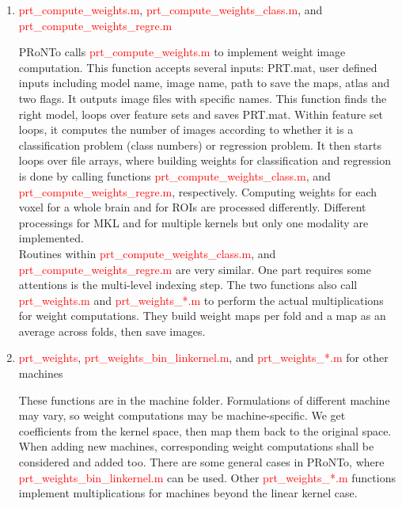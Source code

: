 
\begin{enumerate}

\item \textcolor{red}{prt\_compute\_weights.m}, \textcolor{red}{prt\_compute\_weights\_class.m}, and \textcolor{red}{prt\_compute\_weights\_regre.m}
 
PRoNTo calls \textcolor{red}{prt\_compute\_weights.m} to implement weight image computation. This function accepts several inputs: PRT.mat, user defined inputs including model name, image name, path to save the maps, atlas and two flags. It outputs image files with specific names. This function finds the right model, loops over feature sets and saves PRT.mat. Within feature set loops, it computes the number of images according to whether it is a classification problem (class numbers) or regression problem. It then starts loops over file arrays, where building weights for classification and regression is done by calling functions \textcolor{red}{prt\_compute\_weights\_class.m}, and \textcolor{red}{prt\_compute\_weights\_regre.m}, respectively. Computing weights for each voxel for a whole brain and for ROIs are processed differently. Different processings for MKL and for multiple kernels but only one modality are implemented.
\\
 
Routines within  \textcolor{red}{prt\_compute\_weights\_class.m}, and \textcolor{red}{prt\_compute\_weights\_regre.m} are very similar. One part requires some attentions is the multi-level indexing step. The two functions also call \textcolor{red}{prt\_weights.m} and \textcolor{red}{prt\_weights\_*.m} to perform the actual multiplications for weight computations. They build weight maps per fold and a map as an average across folds, then save images.    
 
\item \textcolor{red}{prt\_weights}, \textcolor{red}{prt\_weights\_bin\_linkernel.m}, and \textcolor{red}{prt\_weights\_*.m} for other machines

These functions are in the machine folder. Formulations of different machine may vary, so weight computations may be machine-specific. We get coefficients from the kernel space, then map them back to the original space. When adding new machines, corresponding weight computations shall be considered and added too. There are some general cases in PRoNTo, where \textcolor{red}{prt\_weights\_bin\_linkernel.m} can be used. Other \textcolor{red}{prt\_weights\_*.m} functions implement multiplications for machines beyond the linear kernel case.
\\
 

\end{enumerate}
